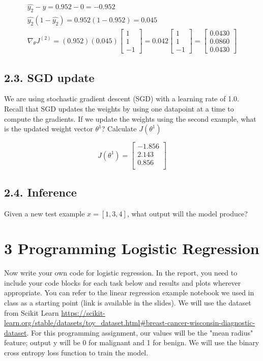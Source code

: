 \documentclass[11pt]{article}
\theoremstyle{plain}
\begin{document}
\[
	\begin{gathered}
		\\ \hat{y_2} - y = 0.952-0 = -0.952
		\\ \hat{y_2} (1-\hat{y_2}) = 0.952(1-0.952) = 0.045
		\\ \nabla_{\theta}J^{(2)} = (0.952)(0.045)
		\begin{bmatrix}
			1 \\
			1 \\
			-1
		\end{bmatrix} = 0.042
		\begin{bmatrix}
			1 \\
			1 \\
			-1
		\end{bmatrix} =
		\begin{bmatrix}
			0.0430 \\
			0.0860 \\
			0.0430
		\end{bmatrix}
	\end{gathered}
\]

\subsection*{2.3. SGD update }
We are using stochastic gradient descent (SGD) with a learning rate of 1.0.  Recall that SGD updates the weights by using one datapoint at a time to compute the gradients.  If we update the weights using the second example, what is the updated weight vector $\theta^{1}$? Calculate $J(\theta^{1})$

\[
	J(\theta^{1}) =
	\begin{bmatrix}
		-1.856 \\
		2.143  \\
		0.856  \\
	\end{bmatrix}
\]

\subsection*{2.4. Inference }
Given a new test example $x=[1,3,4]$, what output will the model produce?

\section*{3 Programming Logistic Regression   }
Now write your own code for logistic regression. In the report, you need to include your code blocks for each task below and results and plots wherever appropriate.  You can refer to the linear regression example notebook we used in class as a starting point (link is available in the slides).  We will use the dataset from Scikit Learn \url{https://scikit-learn.org/stable/datasets/toy_dataset.html#breast-cancer-wisconsin-diagnostic-dataset}.  For this programming assignment, our values will be the "mean radius" feature;  output y will be 0 for malignant and 1 for benign.  We will use the binary cross entropy loss function to train the model.
\end{document}
